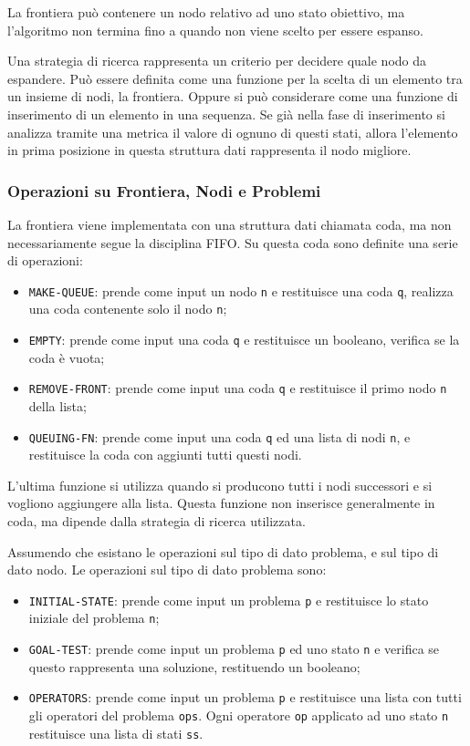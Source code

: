 \documentclass{article}
\numberwithin{equation}{subsection}
\begin{document}
La frontiera può contenere un nodo relativo ad uno stato obiettivo, ma l'algoritmo non 
termina fino a quando non viene scelto per essere espanso. 


Una strategia di ricerca rappresenta un criterio per decidere quale nodo da espandere. 
Può essere definita come una funzione per la scelta di un elemento tra un insieme di nodi, la 
frontiera. Oppure si può considerare come una funzione di inserimento di un elemento in una 
sequenza. Se già nella fase di inserimento si analizza tramite una metrica il valore di ognuno 
di questi stati, allora l'elemento in prima posizione in questa struttura dati rappresenta il 
nodo migliore. 

\subsubsection{Operazioni su Frontiera, Nodi e Problemi}

La frontiera viene implementata con una struttura dati chiamata coda, ma non necessariamente 
segue la disciplina FIFO. Su questa coda sono definite una serie di operazioni:
\begin{itemize}
    \item \color{magenta}\verb|MAKE-QUEUE|\color{black}: prende come input un nodo \verb|n| e restituisce una coda \verb|q|, realizza una coda contenente solo il nodo \verb|n|;
    \item \color{magenta}\verb|EMPTY|\color{black}: prende come input una coda \verb|q| e restituisce un booleano, verifica se la coda è vuota;
    \item \color{magenta}\verb|REMOVE-FRONT|\color{black}: prende come input una coda \verb|q| e restituisce il primo nodo \verb|n| della lista; 
    \item \color{magenta}\verb|QUEUING-FN|\color{black}: prende come input una coda \verb|q| ed una lista di nodi \verb|n|, e restituisce la coda con aggiunti tutti questi nodi. 
\end{itemize}
L'ultima funzione si utilizza quando si producono tutti i nodi successori e si vogliono aggiungere 
alla lista. 
Questa funzione non inserisce generalmente in coda, ma dipende dalla strategia di ricerca 
utilizzata. 

Assumendo che esistano le operazioni sul tipo di dato problema, e sul tipo di dato nodo. Le 
operazioni sul tipo di dato problema sono:
\begin{itemize}
    \item \color{magenta}\verb|INITIAL-STATE|\color{black}: prende come input un problema \verb|p| e restituisce lo stato iniziale del problema \verb|n|;
    \item \color{magenta}\verb |GOAL-TEST|\color{black}: prende come input un problema \verb|p| ed uno stato \verb|n| e verifica se questo rappresenta una soluzione, restituendo un booleano;
    \item \color{magenta}\verb|OPERATORS|\color{black}: prende come input un problema \verb|p| e restituisce una lista con tutti gli operatori del problema \verb|ops|. Ogni operatore \verb|op| applicato ad uno stato \verb|n| restituisce una lista di stati \verb|ss|. 
\end{itemize}
\end{document}
